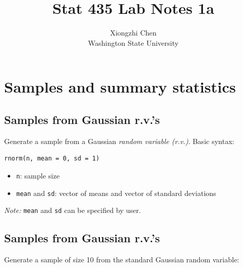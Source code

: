\documentclass[]{article}
\title{Stat 435 Lab Notes 1a}
\author{Xiongzhi Chen \\ Washington State University}
\date{}
\providecommand{\tightlist}{%
  \setlength{\itemsep}{0pt}\setlength{\parskip}{0pt}}
\begin{document}
\maketitle

{
\setcounter{tocdepth}{2}
\tableofcontents
}
\section{}\label{section}

\section{Samples and summary
statistics}\label{samples-and-summary-statistics}

\subsection{Samples from Gaussian
r.v.'s}\label{samples-from-gaussian-r.v.s}

Generate a sample from a Gaussian \emph{random variable (r.v.)}. Basic
syntax:

\begin{verbatim}
rnorm(n, mean = 0, sd = 1)
\end{verbatim}

\begin{itemize}
\tightlist
\item
  \texttt{n}: sample size
\item
  \texttt{mean} and \texttt{sd}: vector of means and vector of standard
  deviations
\end{itemize}

\emph{Note:} \texttt{mean} and \texttt{sd} can be specified by user.

\subsection{Samples from Gaussian
r.v.'s}\label{samples-from-gaussian-r.v.s-1}

Generate a sample of size 10 from the standard Gaussian random variable:
\end{document}
